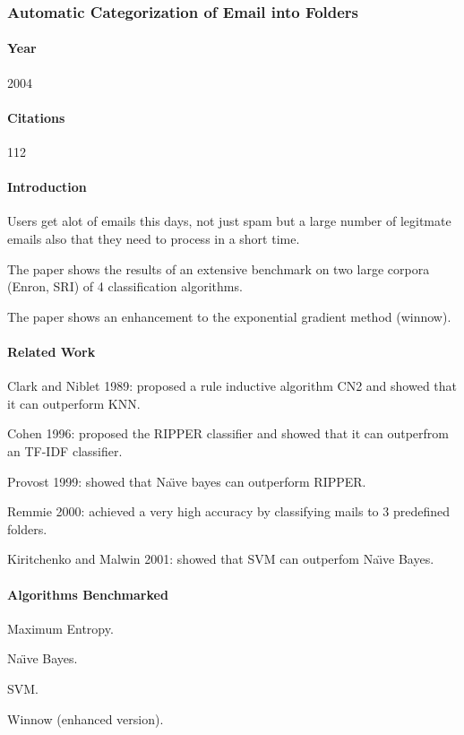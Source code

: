 \documentclass[12pt]{article}
\newenvironment{my_itemize}
{\begin{itemize}
  \setlength{\itemsep}{0cm}
  \setlength{\parskip}{0cm}}
{\end{itemize}}
\begin{document}
\subsubsection{Automatic Categorization of Email into Folders \cite{RON04}}

\paragraph{Year} 2004
\paragraph{Citations} 112
\paragraph{Introduction}
\begin{my_itemize}
  \item Users get alot of emails this days, not just spam but a large number of 
	legitmate emails also that they need to process in a short time.
  \item The paper shows the results of an extensive benchmark on two large corpora 
	(Enron, SRI) of 4 classification algorithms.
  \item The paper shows an enhancement to the exponential gradient method (winnow).
\end{my_itemize}

\paragraph{Related Work}
\begin{my_itemize}
  \item Clark and Niblet 1989: proposed a rule inductive algorithm CN2 and 
	showed that it can outperform KNN.
  \item Cohen 1996: proposed the RIPPER classifier and showed that it 
	can outperfrom an TF-IDF classifier.
  \item Provost 1999: showed that Na\"{\i}ve bayes can outperform RIPPER.
  \item Remmie 2000: achieved a very high accuracy by classifying mails to
	3 predefined folders.
  \item Kiritchenko and Malwin 2001: showed that SVM can outperfom Na\"{\i}ve Bayes.
\end{my_itemize}


\paragraph{Algorithms Benchmarked}
\begin{my_itemize}
  \item Maximum Entropy.
  \item Na\"{\i}ve Bayes.
  \item SVM.
  \item Winnow (enhanced version).
\end{my_itemize}
\end{document}
